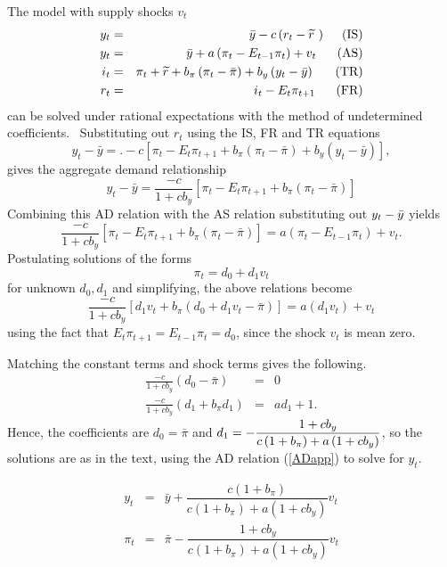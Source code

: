 \documentclass{article}
\begin{document}
\begin{doublespace}
The model with supply shocks $v_{t}$%
\begin{eqnarray}
y_{t} &=&\bar{y}-c\left( r_{t}-\widetilde{r}\text{ }\right) \text{\ \ \ \
(IS)} \\
y_{t} &=&\bar{y}+a\left( \pi _{t}-E_{t-1}\pi _{t}\right) +v_{t}\text{ \ \ \
\ (AS)}  \notag \\
i_{t} &=&\pi _{t}+\widetilde{r}+b_{\pi }\left( \pi _{t}-\bar{\pi}\right)
+b_{y}\left( y_{t}-\bar{y}\right) \text{ \ \ \ \ (TR)}  \notag \\
r_{t} &=&i_{t}-E_{t}\pi _{t+1}\text{ \ \ \ \ (FR)}  \notag
\end{eqnarray}%
can be solved under rational expectations with the method of undetermined
coefficients. \ Substituting out $r_{t}$ using the IS, FR and TR equations 
\begin{equation*}
y_{t}-\bar{y}=.-c\left[ \pi _{t}-E_{t}\pi _{t+1}+b_{\pi }\left( \pi _{t}-%
\bar{\pi}\right) +b_{y}\left( y_{t}-\bar{y}\right) \right] ,
\end{equation*}%
gives the aggregate demand relationship%
\begin{equation}
y_{t}-\bar{y}=\frac{-c}{1+cb_{y}}\left[ \pi _{t}-E_{t}\pi _{t+1}+b_{\pi
}\left( \pi _{t}-\bar{\pi}\right) \right]  \label{ADapp}
\end{equation}%
Combining this AD relation with the AS relation substituting out $y_{t}-\bar{%
y}$ yields%
\begin{equation*}
\frac{-c}{1+cb_{y}}\left[ \pi _{t}-E_{t}\pi _{t+1}+b_{\pi }\left( \pi _{t}-%
\bar{\pi}\right) \right] =a\left( \pi _{t}-E_{t-1}\pi _{t}\right) +v_{t}.
\end{equation*}%
Postulating solutions of the forms%
\begin{equation*}
\pi _{t}=d_{0}+d_{1}v_{t}
\end{equation*}%
for unknown $d_{0},d_{1}$ and simplifying, the above relations become%
\begin{equation*}
\frac{-c}{1+cb_{y}}\left[ d_{1}v_{t}+b_{\pi }\left( d_{0}+d_{1}v_{t}-\bar{\pi%
}\right) \right] =a\left( d_{1}v_{t}\right) +v_{t}
\end{equation*}%
using the fact that $E_{t}\pi _{t+1}=E_{t-1}\pi _{t}=d_{0}$, since the shock 
$v_{t}$ is mean zero. \ 

Matching the constant terms and shock terms gives the following.%
\begin{eqnarray*}
\frac{-c}{1+cb_{y}}\left( d_{0}-\bar{\pi}\right) &=&0 \\
\frac{-c}{1+cb_{y}}\left( d_{1}+b_{\pi }d_{1}\right) &=&ad_{1}+1.
\end{eqnarray*}%
Hence, the coefficients are $d_{0}=\bar{\pi}$ and $d_{1}=-\dfrac{1+cb_{y}}{%
c\left( 1+b_{\pi }\right) +a\left( 1+cb_{y}\right) }$, so the solutions are
as in the text, using the AD relation (\ref{ADapp}) to solve for $y_{t}$.

\begin{eqnarray*}
y_{t} &=&\bar{y}+\dfrac{c\left( 1+b_{\pi }\right) }{c\left( 1+b_{\pi
}\right) +a\left( 1+cb_{y}\right) }v_{t} \\
\pi _{t} &=&\bar{\pi}-\dfrac{1+cb_{y}}{c\left( 1+b_{\pi }\right) +a\left(
1+cb_{y}\right) }v_{t}
\end{eqnarray*}%
\end{doublespace}
\end{document}
